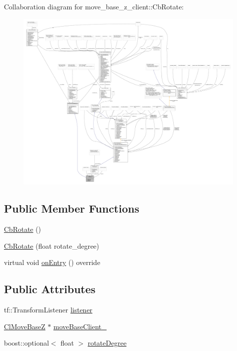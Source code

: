 Collaboration diagram for move\+\_\+base\+\_\+z\+\_\+client\+:\+:Cb\+Rotate\+:
\nopagebreak
\begin{figure}[H]
\begin{center}
\leavevmode
\includegraphics[width=350pt]{classmove__base__z__client_1_1CbRotate__coll__graph}
\end{center}
\end{figure}
\subsection*{Public Member Functions}
\begin{DoxyCompactItemize}
\item 
\hyperlink{classmove__base__z__client_1_1CbRotate_a38365918a9749d2ad85b584a2ab0a102}{Cb\+Rotate} ()
\item 
\hyperlink{classmove__base__z__client_1_1CbRotate_aca51890e44db143f216d9951ab2afaf3}{Cb\+Rotate} (float rotate\+\_\+degree)
\item 
virtual void \hyperlink{classmove__base__z__client_1_1CbRotate_ac04e8dece248a97726a533820d15dfbe}{on\+Entry} () override
\end{DoxyCompactItemize}
\subsection*{Public Attributes}
\begin{DoxyCompactItemize}
\item 
tf\+::\+Transform\+Listener \hyperlink{classmove__base__z__client_1_1CbRotate_ad9afe4d39997d7b44fc304f81f519cc5}{listener}
\item 
\hyperlink{classmove__base__z__client_1_1ClMoveBaseZ}{Cl\+Move\+BaseZ} $\ast$ \hyperlink{classmove__base__z__client_1_1CbRotate_a292c3739c4c1e668c0c6e241127b5c50}{move\+Base\+Client\+\_\+}
\item 
boost\+::optional$<$ float $>$ \hyperlink{classmove__base__z__client_1_1CbRotate_a30d0f24b857149d78a023635562516b6}{rotate\+Degree}
\end{DoxyCompactItemize}


